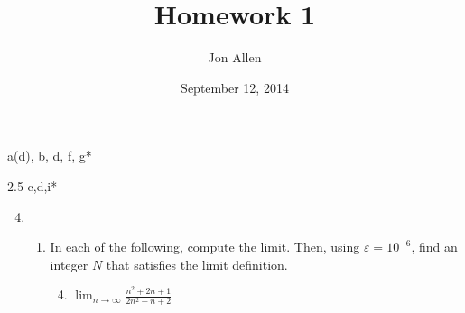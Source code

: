 \documentclass[letterpaper]{article}
\begin{document}
\title{Homework 1}
\date{September 12, 2014}
\author{Jon Allen}
 a(d), b, d, f, g*

2.5 c,d,i*
\renewcommand{\labelenumi}{2.\arabic{enumi}}
\renewcommand{\labelenumii}{\Alph{enumii}.}
\renewcommand{\labelenumiii}{(\alph{enumiii})}
\begin{enumerate}
\setcounter{enumi}{3}
\item
  \begin{enumerate}
  \item
  In each of the following, compute the limit. Then, using $\varepsilon=10^{-6}$, find an integer $N$ that satisfies the limit definition.
    \begin{enumerate}
    \setcounter{enumiii}{3}
    \item
    $\displaystyle \lim_{n\to\infty}\frac{n^2+2n+1}{2n^2-n+2}$



\end{enumerate}
\end{enumerate}
\end{enumerate}
\end{document}
